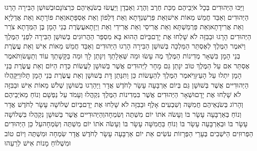 \documentclass[../main/main.tex]{subfiles}
\begin{document}
\begin{multicols}{\ncols}
וַיַּכּוּ הַיְּהוּדִים בְּכָל אֹיְבֵיהֶם מַכַּת חֶרֶב וְהֶרֶג וְאַבְדָן וַיַּעֲשׂוּ בְשֹׂנְאֵיהֶם כִּרְצוֹנָם\PreVerseSpace{}וּבְשׁוּשַׁן הַבִּירָה הָרְגוּ הַיְּהוּדִים וְאַבֵּד חֲמֵשׁ מֵאוֹת אִישׁ\PreVerseSpace{}וְאֵת פַּרְשַׁנְדָּתָא וְאֵת דַּלְפוֹן וְאֵת אַסְפָּתָא\PreVerseSpace{}וְאֵת פּוֹרָתָא וְאֵת אֲדַלְיָא וְאֵת אֲרִידָתָא\PreVerseSpace{}וְאֵת פַּרְמַשְׁתָּא וְאֵת אֲרִיסַי וְאֵת אֲרִידַי וְאֵת וַיְזָתָא\PreVerseSpace{}עֲשֶׂרֶת בְּנֵי הָמָן בֶּן הַמְּדָתָא צֹרֵר הַיְּהוּדִים הָרָגוּ וּבַבִּזָּה לֹא שָׁלְחוּ אֶת יָדָם\PreVerseSpace{}בַּיּוֹם הַהוּא בָּא מִסְפַּר הַהֲרוּגִים בְּשׁוּשַׁן הַבִּירָה לִפְנֵי הַמֶּלֶךְ \ClosedSection{}וַיֹּאמֶר הַמֶּלֶךְ לְאֶסְתֵּר הַמַּלְכָּה בְּשׁוּשַׁן הַבִּירָה הָרְגוּ הַיְּהוּדִים וְאַבֵּד חֲמֵשׁ מֵאוֹת אִישׁ וְאֵת עֲשֶׂרֶת בְּנֵי הָמָן בִּשְׁאָר מְדִינוֹת הַמֶּלֶךְ מֶה עָשׂוּ וּמַה שְּׁאֵלָתֵךְ וְיִנָּתֵן לָךְ וּמַה בַּקָּשָׁתֵךְ עוֹד וְתֵעָשׂ\PreVerseSpace{}וַתֹּאמֶר אֶסְתֵּר אִם עַל הַמֶּלֶךְ טוֹב יִנָּתֵן גַּם מָחָר לַיְּהוּדִים אֲשֶׁר בְּשׁוּשָׁן לַעֲשׂוֹת כְּדָת הַיּוֹם וְאֵת עֲשֶׂרֶת בְּנֵי הָמָן יִתְלוּ עַל הָעֵץ\PreVerseSpace{}וַיֹּאמֶר הַמֶּלֶךְ לְהֵעָשׂוֹת כֵּן וַתִּנָּתֵן דָּת בְּשׁוּשָׁן וְאֵת עֲשֶׂרֶת בְּנֵי הָמָן תָּלוּ\PreVerseSpace{}וַיִּקָּהֲלוּ הַיְּהוּדִיּים אֲשֶׁר בְּשׁוּשָׁן גַּם בְּיוֹם אַרְבָּעָה עָשָׂר לְחֹדֶשׁ אֲדָר וַיַּהַרְגוּ בְשׁוּשָׁן שְׁלֹשׁ מֵאוֹת אִישׁ וּבַבִּזָּה לֹא שָׁלְחוּ אֶת יָדָם\PreVerseSpace{}וּשְׁאָר הַיְּהוּדִים אֲשֶׁר בִּמְדִינוֹת הַמֶּלֶךְ נִקְהֲלוּ וְעָמֹד עַל נַפְשָׁם וְנוֹחַ מֵאֹיְבֵיהֶם וְהָרוֹג בְּשֹׂנְאֵיהֶם חֲמִשָּׁה וְשִׁבְעִים אָלֶף וּבַבִּזָּה לֹא שָׁלְחוּ אֶת יָדָם\PreVerseSpace{}בְּיוֹם שְׁלוֹשָׁה עָשָׂר לְחֹדֶשׁ אֲדָר וְנוֹחַ בְּאַרְבָּעָה עָשָׂר בּוֹ וְעָשֹׂה אֹתוֹ יוֹם מִשְׁתֶּה וְשִׂמְחָה\PreVerseSpace{}וְהַיְּהוּדִיּים אֲשֶׁר בְּשׁוּשָׁן נִקְהֲלוּ בִּשְׁלוֹשָׁה עָשָׂר בּוֹ וּבְאַרְבָּעָה עָשָׂר בּוֹ וְנוֹחַ בַּחֲמִשָּׁה עָשָׂר בּוֹ וְעָשֹׂה אֹתוֹ יוֹם מִשְׁתֶּה וְשִׂמְחָה\PreVerseSpace{}עַל כֵּן הַיְּהוּדִים הַפְּרוּזִים הַיֹּשְׁבִים בְּעָרֵי הַפְּרָזוֹת עֹשִׂים אֵת יוֹם אַרְבָּעָה עָשָׂר לְחֹדֶשׁ אֲדָר שִׂמְחָה וּמִשְׁתֶּה וְיוֹם טוֹב וּמִשְׁלוֹחַ מָנוֹת אִישׁ לְרֵעֵהוּ\OpenSection{}\par

\end{multicols}
\end{document}
